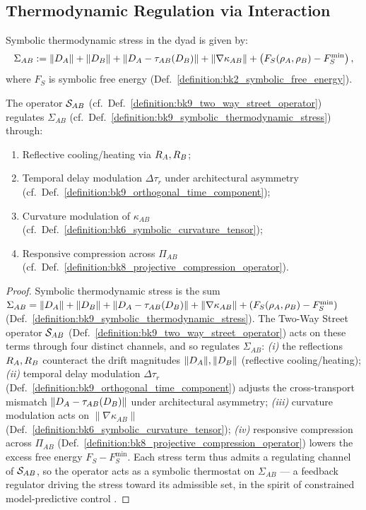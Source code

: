 \subsection{Thermodynamic Regulation via Interaction}
\label{subsec:bk9_thermodynamic_regulation_via_interaction}
\begin{definition}
\label{definition:bk9_symbolic_thermodynamic_stress}
Symbolic thermodynamic stress in the dyad is given by:
\[
\Sigma_{AB} := \|D_A\| + \|D_B\| + \|D_A - \tau_{AB}(D_B)\| + \|\nabla \kappa_{AB}\| + \left(F_S(\rho_A, \rho_B) - F_S^\text{min}\right),
\]
where \( F_S \) is symbolic free energy (Def.~\ref{definition:bk2_symbolic_free_energy}).
\end{definition}
\begin{theorem}
\label{theorem:bk9_symbolic_thermostat}
The operator \( \mathcal{S}_{AB} \) (cf.~Def.~\ref{definition:bk9_two_way_street_operator}) regulates \( \Sigma_{AB} \) (cf.~Def.~\ref{definition:bk9_symbolic_thermodynamic_stress}) through:
\begin{enumerate}[label=(\roman*)]
    \item Reflective cooling/heating via \( R_A, R_B \);
    \item Temporal delay modulation \( \Delta \tau_r \) under architectural asymmetry (cf.~Def.~\ref{definition:bk9_orthogonal_time_component});
    \item Curvature modulation of \( \kappa_{AB} \) (cf.~Def.~\ref{definition:bk6_symbolic_curvature_tensor});
    \item Responsive compression across \( \Pi_{AB} \) (cf.~Def.~\ref{definition:bk8_projective_compression_operator}).
\end{enumerate}
\end{theorem}
\begin{proof}
\label{proof:bk9_symbolic_thermostat}
\leavevmode
Symbolic thermodynamic stress is the sum $\Sigma_{AB}=\|D_A\|+\|D_B\|+\|D_A-\tau_{AB}(D_B)\|+\|\nabla\kappa_{AB}\|+(F_S(\rho_A,\rho_B)-F_S^{\text{min}})$ (Def.~\ref{definition:bk9_symbolic_thermodynamic_stress}). The Two-Way Street operator $\mathcal{S}_{AB}$ (Def.~\ref{definition:bk9_two_way_street_operator}) acts on these terms through four distinct channels, and so regulates $\Sigma_{AB}$: \emph{(i)} the reflections $R_A,R_B$ counteract the drift magnitudes $\|D_A\|,\|D_B\|$ (reflective cooling/heating); \emph{(ii)} temporal delay modulation $\Delta\tau_r$ (Def.~\ref{definition:bk9_orthogonal_time_component}) adjusts the cross-transport mismatch $\|D_A-\tau_{AB}(D_B)\|$ under architectural asymmetry; \emph{(iii)} curvature modulation acts on $\|\nabla\kappa_{AB}\|$ (Def.~\ref{definition:bk6_symbolic_curvature_tensor}); \emph{(iv)} responsive compression across $\Pi_{AB}$ (Def.~\ref{definition:bk8_projective_compression_operator}) lowers the excess free energy $F_S-F_S^{\text{min}}$. Each stress term thus admits a regulating channel of $\mathcal{S}_{AB}$, so the operator acts as a symbolic thermostat on $\Sigma_{AB}$ --- a feedback regulator driving the stress toward its admissible set, in the spirit of constrained model-predictive control \citep{mayne2000constrained}.
\end{proof}
